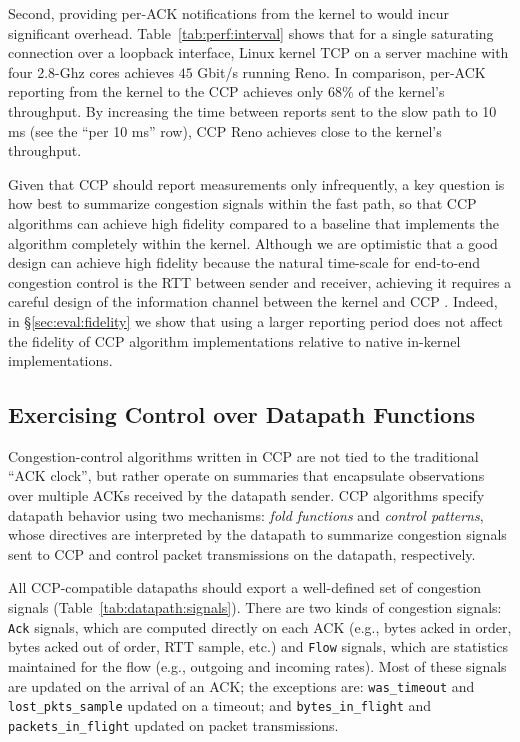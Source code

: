 Second, providing per-ACK notifications from the kernel to \userspace would incur
significant overhead.
%
Table~\ref{tab:perf:interval} shows that for a single saturating 
connection over a loopback interface, Linux kernel TCP on a server machine
with four 2.8-Ghz cores achieves $45$ Gbit/s running Reno.
%
In comparison, per-ACK reporting from the kernel to the CCP \userspace achieves
only 68\% of the kernel's throughput.
%
By increasing the time between reports sent to the slow path to 10 ms (see the
``per 10 ms'' row), CCP Reno achieves close to the kernel's throughput.

Given that CCP should report measurements only infrequently, a key question is
how best to summarize congestion signals within the fast path, so that CCP
algorithms can achieve high fidelity compared to a baseline that implements the
algorithm completely within the kernel.
Although we are optimistic that a good design can achieve high fidelity because the natural time-scale for end-to-end
congestion control is the RTT between sender and receiver,
achieving it requires a careful design of the information channel between the kernel and CCP \userspace.
Indeed, in \S\ref{sec:eval:fidelity} we show that using a
larger reporting period does not affect the fidelity of CCP algorithm
implementations relative to native in-kernel implementations.


\subsection{Exercising Control over Datapath Functions}

 
Congestion-control algorithms written in CCP are not tied to the traditional ``ACK clock'', but rather operate on summaries that encapsulate observations over multiple ACKs received by the datapath sender.
CCP algorithms specify datapath behavior using two mechanisms: {\em fold functions} and {\em control patterns}, whose directives are interpreted by the datapath to summarize congestion signals sent to CCP and control packet transmissions on the datapath, respectively. 
 
 All CCP-compatible datapaths should export a well-defined set of congestion signals (Table~\ref{tab:datapath:signals}). There are two kinds of congestion signals: \texttt{Ack} signals, which are computed directly on each ACK (e.g., bytes acked in order, bytes acked out of order, RTT sample, etc.) and \texttt{Flow} signals, which are statistics maintained for the flow (e.g., outgoing and incoming rates). Most of these signals are updated on the arrival of an ACK; the exceptions are: \texttt{was\_timeout} and \texttt{lost\_pkts\_sample} updated on a timeout; and \texttt{bytes\_in\_flight} and \texttt{packets\_in\_flight} updated on packet transmissions.
 
